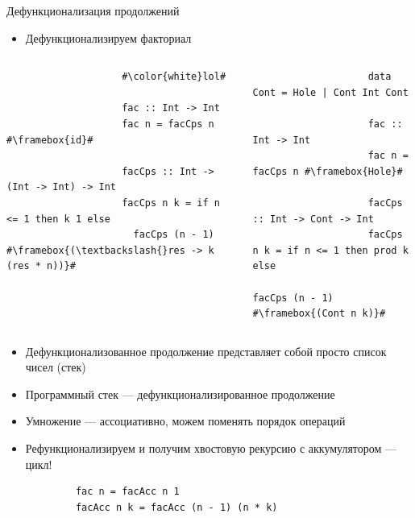     \begin{frame}[fragile]{Дефункционализация продолжений}
        \begin{itemize}
            \item Дефункционализируем факториал
        \end{itemize}
        \vspace{-3em}
        \begin{columns}[onlytextwidth]
            \begin{column}[t]{0.485\textwidth}
                \begin{verbatim}
                    #\color{white}lol#

                    fac :: Int -> Int
                    fac n = facCps n #\framebox{id}#

                    facCps :: Int -> (Int -> Int) -> Int
                    facCps n k = if n <= 1 then k 1 else
                      facCps (n - 1) #\framebox{(\textbackslash{}res -> k (res * n))}#
                \end{verbatim}
            \end{column}\hfill%
            \begin{column}[t]{0.485\textwidth}
                \begin{verbatim}
                    data Cont = Hole | Cont Int Cont

                    fac :: Int -> Int
                    fac n = facCps n #\framebox{Hole}#

                    facCps :: Int -> Cont -> Int
                    facCps n k = if n <= 1 then prod k else
                      facCps (n - 1) #\framebox{(Cont n k)}#
                \end{verbatim}
            \end{column}
        \end{columns}
        \vspace{1em}
        \begin{itemize}
            \item \pause Дефункционализованное продолжение представляет собой просто список чисел (стек)
            \item Программный стек --- дефункционализированное продолжение
            \item \pause Умножение --- ассоциативно, можем поменять порядок операций
            \item Рефункционализируем и получим хвостовую рекурсию с аккумулятором --- цикл!
        \end{itemize}
        \vspace{0.5em}
        \begin{verbatim}
            fac n = facAcc n 1
            facAcc n k = facAcc (n - 1) (n * k)
        \end{verbatim}
    \end{frame}

